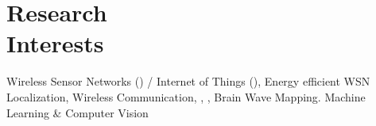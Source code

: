 \vspace{-2.5em}
{\section{Research\\Interests}
Wireless Sensor Networks () / Internet of Things (), Energy efficient WSN Localization, Wireless Communication, , , Brain Wave Mapping. Machine Learning  \& Computer Vision\\
\vspace{-1em}
\sectionline
}
